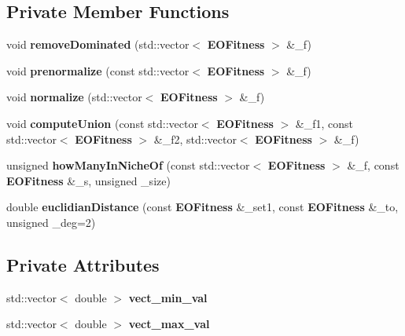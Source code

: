 \subsection*{Private Member Functions}
\begin{CompactItemize}
\item 
void {\bf remove\-Dominated} (std::vector$<$ {\bf EOFitness} $>$ \&\_\-f)\label{classmoeoEntropyMetric_3252e7534b1ceb1317936c5d2b3abcbe}

\item 
void {\bf prenormalize} (const std::vector$<$ {\bf EOFitness} $>$ \&\_\-f)\label{classmoeoEntropyMetric_c9f0c65b4de69accbfb42486f6445cb0}

\item 
void {\bf normalize} (std::vector$<$ {\bf EOFitness} $>$ \&\_\-f)\label{classmoeoEntropyMetric_bc32468b148a0da4eb21a9fc14dfafae}

\item 
void {\bf compute\-Union} (const std::vector$<$ {\bf EOFitness} $>$ \&\_\-f1, const std::vector$<$ {\bf EOFitness} $>$ \&\_\-f2, std::vector$<$ {\bf EOFitness} $>$ \&\_\-f)\label{classmoeoEntropyMetric_2de60a0e6be362f074b50e6b455152ab}

\item 
unsigned {\bf how\-Many\-In\-Niche\-Of} (const std::vector$<$ {\bf EOFitness} $>$ \&\_\-f, const {\bf EOFitness} \&\_\-s, unsigned \_\-size)\label{classmoeoEntropyMetric_a9369be315e139ebdf19fac09ad0563f}

\item 
double {\bf euclidian\-Distance} (const {\bf EOFitness} \&\_\-set1, const {\bf EOFitness} \&\_\-to, unsigned \_\-deg=2)\label{classmoeoEntropyMetric_34f825ce7c53132f7218483130da8652}

\end{CompactItemize}
\subsection*{Private Attributes}
\begin{CompactItemize}
\item 
std::vector$<$ double $>$ {\bf vect\_\-min\_\-val}\label{classmoeoEntropyMetric_d4046a304badfe78aa35b2d57938ffe9}

\item 
std::vector$<$ double $>$ {\bf vect\_\-max\_\-val}\label{classmoeoEntropyMetric_af0ae9645bdbb993de4bc990a0a08883}

\end{CompactItemize}


